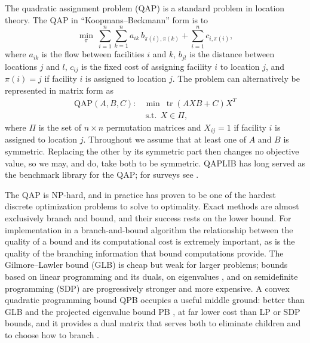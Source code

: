 \documentclass[10pt]{article}
\theoremstyle{remark}
\newcommand{\tr}{\operatorname{tr}}
\begin{document}
The quadratic assignment problem (QAP) is a standard problem in location theory.
The QAP in ``Koopmans--Beckmann'' form is to
\[
  \min_{\pi}\ \sum_{i=1}^n\sum_{k=1}^n a_{ik}\,b_{\pi(i),\pi(k)} + \sum_{i=1}^n c_{i,\pi(i)},
\]
where $a_{ik}$ is the flow between facilities $i$ and $k$, $b_{jl}$ is the
distance between locations $j$ and $l$, $c_{ij}$ is the fixed cost of assigning
facility $i$ to location $j$, and $\pi(i) = j$ if facility $i$ is assigned to
location $j$. The problem can alternatively be represented in matrix form as
\begin{equation}\label{eq:qap}
  \begin{array}{rl}
  \mathrm{QAP}(A,B,C): & \min\ \tr(AXB + C)X^T\\
  & \ \text{s.t.}\ \ X\in\Pi,
  \end{array}
\end{equation}
where $\Pi$ is the set of $n\times n$ permutation matrices and $X_{ij} = 1$ if
facility $i$ is assigned to location $j$. Throughout we assume that at least one of
$A$ and $B$ is symmetric. Replacing the other by its symmetric part then changes no
objective value, so we may, and do, take both to be symmetric. QAPLIB \cite{qaplib}
has long served as the benchmark library for the QAP; for surveys see
\cite{burkardsurvey,loiola}.

The QAP is NP-hard, and in practice has proven to be one of the hardest discrete
optimization problems to solve to optimality. Exact methods are almost exclusively
branch and bound, and their success rests on the lower bound. For implementation in
a branch-and-bound algorithm the relationship between the quality of a bound and
its computational cost is extremely important, as is the quality of the branching
information that bound computations provide. The Gilmore--Lawler bound (GLB)
\cite{gilmore,lawler} is cheap but weak for larger problems; bounds based on linear
programming and its duals, on eigenvalues \cite{hrw}, and on semidefinite
programming (SDP) \cite{zkrw} are progressively stronger and more expensive. A
convex quadratic programming bound QPB \cite{ab01} occupies a useful middle ground:
better than GLB and the projected eigenvalue bound PB \cite{hrw}, at far lower cost
than LP or SDP bounds, and it provides a dual matrix that serves both to eliminate
children and to choose how to branch \cite{ba01}.
\end{document}
